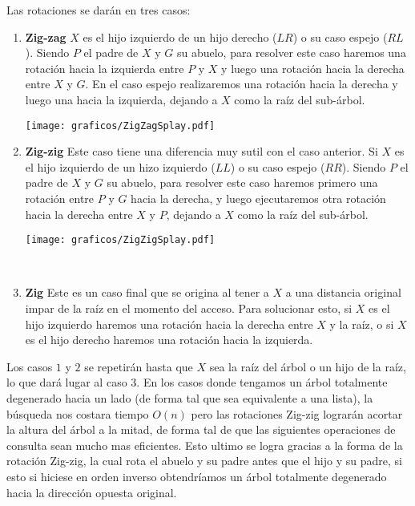 Las rotaciones se dar\'an en tres casos:

\begin{enumerate}
 \item \textbf{Zig-zag} $X$ es el hijo izquierdo de un hijo derecho ($LR$) o su caso espejo ($RL$). Siendo $P$ el padre de $X$ y $G$ su abuelo, para resolver este caso haremos una rotaci\'on hacia la izquierda entre $P$ y $X$ y luego una rotaci\'on hacia la derecha entre $X$ y $G$. En el caso espejo realizaremos una rotaci\'on hacia la derecha y luego una hacia la izquierda, dejando a $X$ como la ra\'iz del sub-\'arbol.
 
 \begin{SCfigure}[1][ht!]
 \centering
 \texttt{[image: graficos/ZigZagSplay.pdf]}
 \end{SCfigure}
 
 \item \textbf{Zig-zig} Este caso tiene una diferencia muy sutil con el caso anterior. Si $X$ es el hijo izquierdo de un hizo izquierdo ($LL$) o su caso espejo ($RR$). Siendo $P$ el padre de $X$ y $G$ su abuelo, para resolver este caso haremos primero una rotaci\'on entre $P$ y $G$ hacia la derecha, y luego ejecutaremos otra rotaci\'on hacia la derecha entre $X$ y $P$, dejando a $X$ como la ra\'iz del sub-\'arbol.
 
 \begin{SCfigure}[1][ht!]
 \centering
 \texttt{[image: graficos/ZigZigSplay.pdf]}
 \end{SCfigure}
 
 ~
 
 \item \textbf{Zig} Este es un caso final que se origina al tener a $X$ a una distancia original impar de la ra\'iz en el momento del acceso. Para solucionar esto, si $X$ es el hijo izquierdo haremos una rotaci\'on hacia la derecha entre $X$ y la ra\'iz, o si $X$ es el hijo derecho haremos una rotaci\'on hacia la izquierda.
\end{enumerate}

Los casos $1$ y $2$ se repetir\'an hasta que $X$ sea la ra\'iz del \'arbol o un hijo de la ra\'iz, lo que dar\'a lugar al caso $3$. En los casos donde tengamos un \'arbol totalmente degenerado hacia un lado (de forma tal que sea equivalente a una lista), la b\'usqueda nos costara tiempo $O(n)$ pero las rotaciones Zig-zig lograr\'an acortar la altura del \'arbol a la mitad, de forma tal de que las siguientes operaciones de consulta sean mucho mas eficientes. Esto ultimo se logra gracias a la forma de la rotaci\'on Zig-zig, la cual rota el abuelo y su padre antes que el hijo y su padre, si esto si hiciese en orden inverso obtendr\'iamos un \'arbol totalmente degenerado hacia la direcci\'on opuesta original. 

